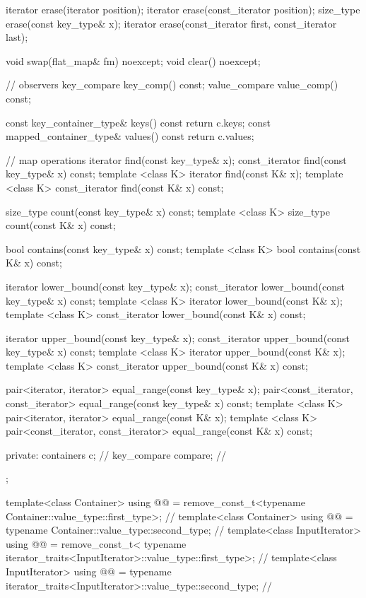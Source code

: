 \begin{codeblock}
\begin{codeblock}
\begin{codeblock}
\begin{addedblock}
\begin{codeblock}
{{    iterator erase(iterator position);
    iterator erase(const_iterator position);
    size_type erase(const key_type& x);
    iterator erase(const_iterator first, const_iterator last);

    void swap(flat_map& fm) noexcept;
    void clear() noexcept;

    // observers
    key_compare key_comp() const;
    value_compare value_comp() const;

    const key_container_type& keys() const      { return c.keys; }
    const mapped_container_type& values() const { return c.values; }

    // map operations
    iterator find(const key_type& x);
    const_iterator find(const key_type& x) const;
    template <class K> iterator find(const K& x);
    template <class K> const_iterator find(const K& x) const;

    size_type count(const key_type& x) const;
    template <class K> size_type count(const K& x) const;

    bool contains(const key_type& x) const;
    template <class K> bool contains(const K& x) const;

    iterator lower_bound(const key_type& x);
    const_iterator lower_bound(const key_type& x) const;
    template <class K> iterator lower_bound(const K& x);
    template <class K> const_iterator lower_bound(const K& x) const;

    iterator upper_bound(const key_type& x);
    const_iterator upper_bound(const key_type& x) const;
    template <class K> iterator upper_bound(const K& x);
    template <class K> const_iterator upper_bound(const K& x) const;

    pair<iterator, iterator> equal_range(const key_type& x);
    pair<const_iterator, const_iterator> equal_range(const key_type& x) const;
    template <class K>
      pair<iterator, iterator> equal_range(const K& x);
    template <class K>
      pair<const_iterator, const_iterator> equal_range(const K& x) const;

  private:
    containers c;        // \expos
    key_compare compare; // \expos
  };

  template<class Container>
    using @@ =
      remove_const_t<typename Container::value_type::first_type>;         // \expos
  template<class Container>
    using @@ =
      typename Container::value_type::second_type;                        // \expos
  template<class InputIterator>
    using @@ = remove_const_t<
      typename iterator_traits<InputIterator>::value_type::first_type>;   // \expos
  template<class InputIterator>
    using @@ =
      typename iterator_traits<InputIterator>::value_type::second_type;   // \expos

}
\end{codeblock}
\end{addedblock}
\end{codeblock}
\end{codeblock}
\end{codeblock}
